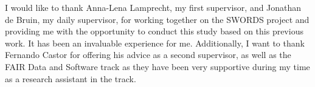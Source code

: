 
I would like to thank Anna-Lena Lamprecht, my first supervisor, and Jonathan de Bruin, my daily supervisor, for working together on the SWORDS project and providing me with the opportunity to conduct this study based on this previous work. It has been an invaluable experience for me. Additionally, I want to thank Fernando Castor for offering his advice as a second supervisor, as well as the FAIR Data and Software track as they have been very supportive during my time as a research assistant in the track.  
